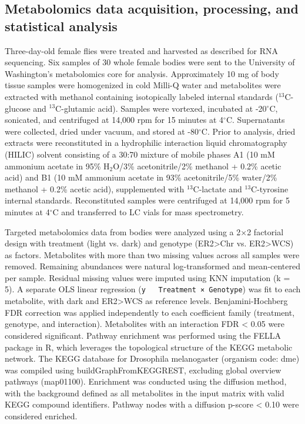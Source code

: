 \subsection*{Metabolomics data acquisition, processing, and statistical analysis}

Three-day-old female flies were treated and harvested as described for RNA sequencing. 
Six samples of 30 whole female bodies were sent to the University of Washington's metabolomics core for analysis. 
Approximately 10 mg of body tissue samples were homogenized in cold Milli-Q water and metabolites were extracted with methanol containing isotopically labeled internal standards ($^{13}$C-glucose and $^{13}$C-glutamic acid).
Samples were vortexed, incubated at -20$^{\circ}$C, sonicated, and centrifuged at 14,000 rpm for 15 minutes at 4$^{\circ}$C.
Supernatants were collected, dried under vacuum, and stored at -80$^{\circ}$C.
Prior to analysis, dried extracts were reconstituted in a hydrophilic interaction liquid chromatography (HILIC) solvent consisting of a 30:70 mixture of mobile phases A1 (10 mM ammonium acetate in 95\% H$_2$O/3\% acetonitrile/2\% methanol + 0.2\% acetic acid) and B1 (10 mM ammonium acetate in 93\% acetonitrile/5\% water/2\% methanol + 0.2\% acetic acid), supplemented with $^{13}$C-lactate and $^{13}$C-tyrosine internal standards.
Reconstituted samples were centrifuged at 14,000 rpm for 5 minutes at 4$^{\circ}$C and transferred to LC vials for mass spectrometry.

Targeted metabolomics data from bodies were analyzed using a 2$\times$2 factorial design with treatment (light vs. dark) and genotype (ER2>Chr vs. ER2>WCS) as factors. 
Metabolites with more than two missing values across all samples were removed. 
Remaining abundances were natural log-transformed and mean-centered per sample. 
Residual missing values were imputed using KNN imputation (k = 5). 
A separate OLS linear regression (\texttt{y ~ Treatment × Genotype}) was fit to each metabolite, with dark and ER2>WCS as reference levels. 
Benjamini-Hochberg FDR correction was applied independently to each coefficient family (treatment, genotype, and interaction). 
Metabolites with an interaction FDR < 0.05 were considered significant.
Pathway enrichment was performed using the FELLA package in R, which leverages the topological structure of the KEGG metabolic network. 
The KEGG database for Drosophila melanogaster (organism code: dme) was compiled using buildGraphFromKEGGREST, excluding global overview pathways (map01100). 
Enrichment was conducted using the diffusion method, with the background defined as all metabolites in the input matrix with valid KEGG compound identifiers. 
Pathway nodes with a diffusion p-score < 0.10 were considered enriched.